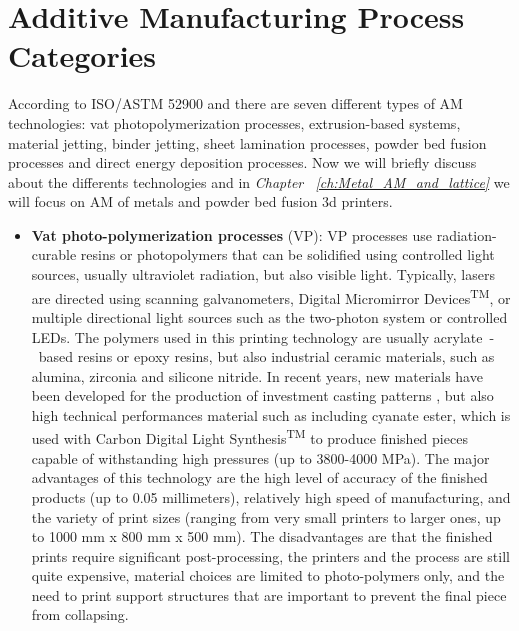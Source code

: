 \section{Additive Manufacturing Process Categories} \label{sec:AMproc}
According to ISO/ASTM 52900 \cite{international_standard_organization_isoastm_2015} and \citeauthor{gibson_additive_2015} there are seven different types of AM technologies: vat photopolymerization processes, extrusion-based systems, material jetting, binder jetting, sheet lamination processes, powder bed fusion processes and direct energy deposition processes. Now we will briefly discuss about the differents technologies and in \textit{Chapter~ \ref{ch:Metal_AM_and_lattice}} we will focus on AM of metals and powder bed fusion 3d printers.
\begin{itemize}
    \item \textbf{Vat photo-polymerization processes} (VP): VP processes use radiation-curable resins or photopolymers that can be solidified using controlled light sources, usually ultraviolet radiation, but also visible light. Typically, lasers are directed using scanning galvanometers, Digital Micromirror Devices\textsuperscript{TM}, or multiple directional light sources such as the two-photon system or controlled LEDs. The polymers used in this printing technology are usually acrylate~-~based resins or epoxy resins, but also industrial ceramic materials, such as alumina, zirconia and silicone nitride. In recent years, new materials have been developed for the production of investment casting patterns \cite{3d_systems_investment_nodate}, but also high technical performances material such as including cyanate ester, which is used with Carbon Digital Light Synthesis\textsuperscript{TM} to produce finished pieces capable of withstanding high pressures (up to 3800-4000 MPa)\cite{carbon_what_nodate}. The major advantages of this technology are the high level of accuracy of the finished products (up to 0.05 millimeters), relatively high speed of manufacturing, and the variety of print sizes (ranging from very small printers to larger ones, up to 1000 mm x 800 mm x 500 mm). The disadvantages are that the finished prints require significant post-processing, the printers and the process are still quite expensive, material choices are limited to photo-polymers only, and the need to print support structures that are important to prevent the final piece from collapsing.

\end{itemize}
